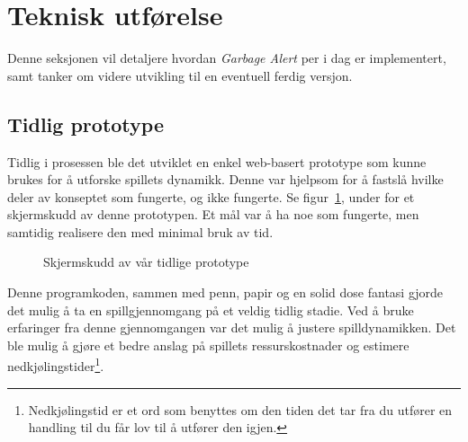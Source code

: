 \section{Teknisk utførelse}\label{sec:teknisk}
Denne seksjonen vil detaljere hvordan \emph{Garbage Alert} per i dag er
implementert, samt tanker om videre utvikling til en eventuell ferdig
versjon.
\subsection{Tidlig prototype}
Tidlig i prosessen ble det utviklet en enkel web-basert prototype som
kunne brukes for å utforske spillets dynamikk. Denne var hjelpsom for å
fastslå hvilke deler av konseptet som fungerte, og ikke fungerte. Se
figur~\ref{fig:screenshot_tidlig_prototype}, under for et skjermskudd av
denne prototypen. Et mål var å ha noe som fungerte, men samtidig
realisere den med minimal bruk av tid.
\begin{figure} [H]
	\begin{center}
	\setlength\fboxsep{0.2pt}
	\setlength\fboxrule{0.7pt}
	\end{center}
	\caption{Skjermskudd av vår tidlige prototype}
	\label{fig:screenshot_tidlig_prototype}
\end{figure}

Denne programkoden, sammen med penn, papir og en solid dose fantasi
gjorde det mulig å ta en spillgjennomgang på et veldig tidlig stadie.
Ved å bruke erfaringer fra denne gjennomgangen var det mulig å justere
spilldynamikken. Det ble mulig å gjøre et bedre anslag på spillets
ressurskostnader og estimere
nedkjølingstider\footnote{Nedkjølingstid er et ord som benyttes om den
tiden det tar fra du utfører en handling til du får lov til å utfører
den igjen.}.

